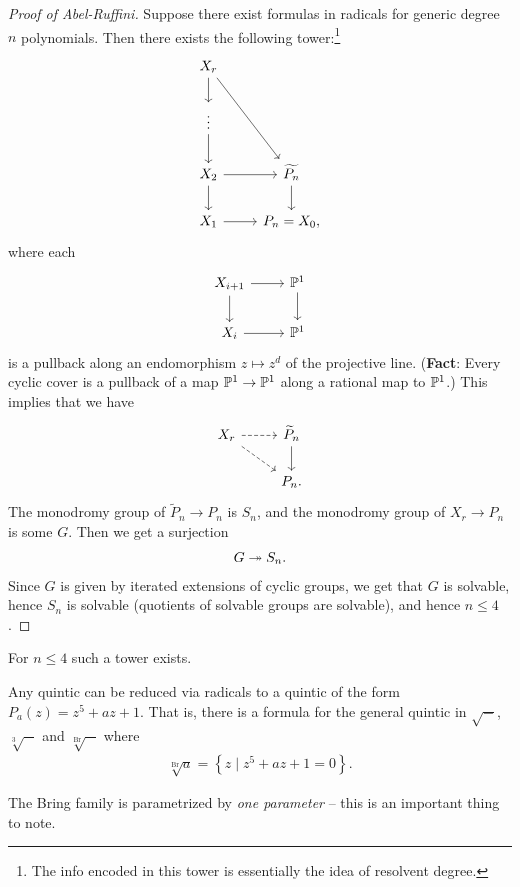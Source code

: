 \documentclass[11pt]{amsart}
\let\til\widetilde
\providecommand{\Br}{\mathrm{Br}}
\begin{document}
\begin{proof}[Proof of Abel-Ruffini] Suppose there exist formulas in radicals for generic degree $n$ polynomials. Then there exists the following tower:\footnote{
The info encoded in this tower is essentially the idea of resolvent degree.}
\[\begin{tikzcd}
    X_r\dar\ar[ddr] & \\
    \vdots \dar & \\
    X_2 \rar\dar & \til{P_n}\dar\\
    X_1\rar & P_n = X_0,
\end{tikzcd} \]
where each
\[ \begin{tikzcd}
    X_{i+1}\rar\dar & \P^1\dar\\
    X_i\rar & \P^1
\end{tikzcd} \]
is a pullback along an endomorphism $z \mapsto z^d$ of the projective line. (\textbf{Fact}: Every cyclic cover is a pullback of a map $\P^1 \to \P^1$ along a rational map to $\P^1$.) This implies that we have
\[ \begin{tikzcd}
    X_r\rar[dashed]\ar[dr,dashed] & \til{P}_n\dar\\
     & P_n.
\end{tikzcd} \]
The monodromy group of $\til{P}_n \to P_n$ is $S_n$, and the monodromy group of $X_r \to P_n$ is some $G$. Then we get a surjection
\begin{align*}
    G \tto S_n.
\end{align*}
Since $G$ is given by iterated extensions of cyclic groups, we get that $G$ is solvable, hence $S_n$ is solvable (quotients of solvable groups are solvable), and hence $n\le 4$.
\end{proof}

\begin{note} For $n\le 4$ such a tower exists.
\end{note}

\begin{theorem}[Bring, 1786] Any quintic can be reduced via radicals to a quintic of the form $P_a(z) = z^5 + az + 1$. That is, there is a formula for the general quintic in $\sqrt{-}$, $\sqrt[3]{-}$ and $\sqrt[\Br]{-}$ where
\begin{align*}
    \sqrt[\Br]{a} = \left\{ z \mid z^5 + az + 1 = 0 \right\}.
\end{align*}
\end{theorem}

The Bring family is parametrized by \textit{one parameter} -- this is an important thing to note.
\end{document}
